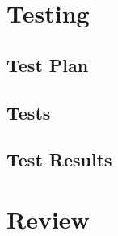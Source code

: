 \documentclass{article}
\begin{document}
\section{Testing}
\subsection{Test Plan}

\subsection{Tests}

\subsection{Test Results}

\section{Review}
\end{document}

